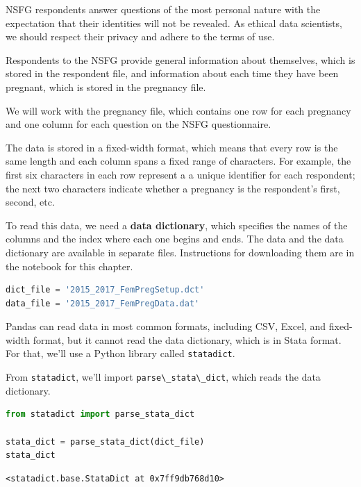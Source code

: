 NSFG respondents answer questions of the most personal nature with the
expectation that their identities will not be revealed. As ethical data
scientists, we should respect their privacy and adhere to the terms of
use.

Respondents to the NSFG provide general information about themselves,
which is stored in the respondent file, and information about each time
they have been pregnant, which is stored in the pregnancy file.

We will work with the pregnancy file, which contains one row for each
pregnancy and one column for each question on the NSFG questionnaire.

The data is stored in a fixed-width format, which means that every row
is the same length and each column spans a fixed range of characters.
For example, the first six characters in each row represent a a unique
identifier for each respondent; the next two characters indicate whether
a pregnancy is the respondent's first, second, etc.

To read this data, we need a \textbf{data dictionary}, which specifies
the names of the columns and the index where each one begins and ends.
The data and the data dictionary are available in separate files.
Instructions for downloading them are in the notebook for this chapter.

\begin{lstlisting}[language=Python,style=source]
dict_file = '2015_2017_FemPregSetup.dct'
data_file = '2015_2017_FemPregData.dat'
\end{lstlisting}

Pandas can read data in most common formats, including CSV, Excel, and
fixed-width format, but it cannot read the data dictionary, which is in
Stata format. For that, we'll use a Python library called
\passthrough{\lstinline!statadict!}.

From \passthrough{\lstinline!statadict!}, we'll import
\passthrough{\lstinline!parse\_stata\_dict!}, which reads the data
dictionary.

\begin{lstlisting}[language=Python,style=source]
from statadict import parse_stata_dict

stata_dict = parse_stata_dict(dict_file)
stata_dict
\end{lstlisting}

\begin{lstlisting}[style=output]
<statadict.base.StataDict at 0x7ff9db768d10>
\end{lstlisting}


